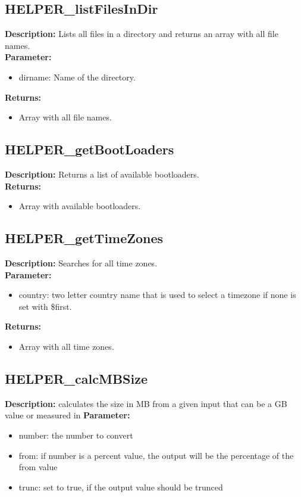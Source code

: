 \subsection{HELPER\_listFilesInDir}
\textbf{Description:} Lists all files in a directory and returns an array with all file names.\\
\textbf{Parameter:}
\begin{itemize}
\item dirname: Name of the directory.
\end{itemize}
\textbf{Returns:}
\begin{itemize}
\item Array with all file names.
\end{itemize}

\subsection{HELPER\_getBootLoaders}
\textbf{Description:} Returns a list of available bootloaders.\\
\textbf{Returns:}
\begin{itemize}
\item Array with available bootloaders.
\end{itemize}

\subsection{HELPER\_getTimeZones}
\textbf{Description:} Searches for all time zones.\\
\textbf{Parameter:}
\begin{itemize}
\item country: two letter country name that is used to select a timezone if none is set with \$first.
\end{itemize}
\textbf{Returns:}
\begin{itemize}
\item Array with all time zones.
\end{itemize}

\subsection{HELPER\_calcMBSize}
\textbf{Description:} calculates the size in MB from a given input that can be a GB value or measured in %
\textbf{Parameter:}
\begin{itemize}
\item number: the number to convert
\item from: if number is a percent value, the output will be the percentage of the from value
\item trunc: set to true, if the output value should be trunced
\end{itemize}

